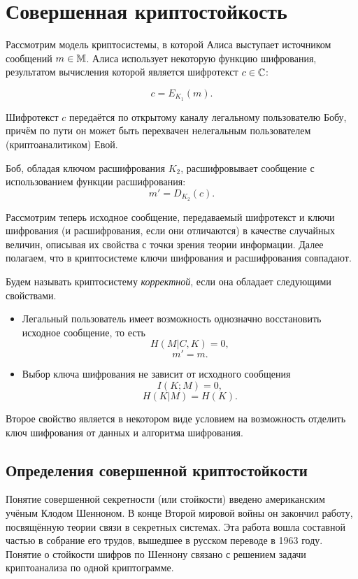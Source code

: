 \chapter{Совершенная криптостойкость}

Рассмотрим модель криптосистемы, в которой Алиса выступает источником сообщений $m \in \mathbb{M}$. Алиса использует некоторую функцию шифрования, результатом вычисления которой является шифротекст $c \in \mathbb{C}$:

	\[c = E_{K_1}\left(m\right).\]

Шифротекст $c$ передаётся по открытому каналу легальному пользователю Бобу, причём по пути он может быть перехвачен нелегальным пользователем (криптоаналитиком) Евой.

Боб, обладая ключом расшифрования $K_2$, расшифровывает сообщение с использованием функции расшифрования:
	\[m' = D_{K_2}\left(c \right).\]

Рассмотрим теперь исходное сообщение, передаваемый шифротекст и ключи шифрования (и расшифрования, если они отличаются) в качестве случайных величин, описывая их свойства с точки зрения теории информации. Далее полагаем, что в криптосистеме ключи шифрования и расшифрования совпадают.

Будем называть криптосистему \emph{корректной}, если она обладает следующими свойствами.
\begin{itemize}
	\item Легальный пользователь имеет возможность однозначно восстановить исходное сообщение, то есть
					\[H \left( M | C, K \right) = 0, \]
					\[m' = m.\]
	\item Выбор ключа шифрования не зависит от исходного сообщения
					\[ I \left( K ; M \right) = 0, \]
					\[ H \left( K | M \right) = H \left( K \right). \]
\end{itemize}

Второе свойство является в некотором виде условием на возможность отделить ключ шифрования от данных и алгоритма шифрования.

\section[Определения]{Определения совершенной криптостойкости}

Понятие совершенной секретности (или стойкости) введено американским учёным Клодом Шенноном. В конце Второй мировой войны он закончил работу, посвящённую теории связи в секретных системах\cite{Shannon:1949:CTS}. Эта работа вошла составной частью в собрание его трудов, вышедшее в русском переводе в 1963 году.~\cite{Shannon:1963} Понятие о стойкости шифров по Шеннону связано с решением задачи криптоанализа по одной криптограмме.

